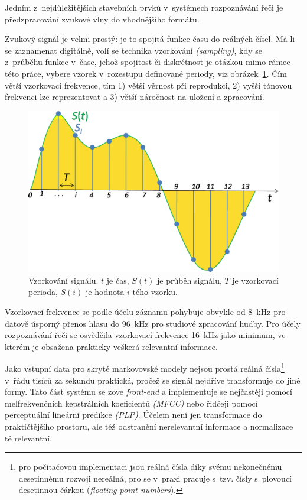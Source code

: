 Jedním z~nejdůležitějších stavebních prvků v~systémech rozpoznávání řeči je
předzpracování zvukové vlny do vhodnějšího formátu.

Zvukový signál je velmi prostý: je to spojitá funkce času do reálných čísel.
Má-li se zaznamenat digitálně, volí se technika vzorkování \textit{(sampling)},
kdy se z~průběhu funkce v~čase, jehož spojitost či diskrétnost je otázkou mimo
rámec této práce, vybere vzorek v~rozestupu definované periody, viz
obrázek~\ref{fig:sampling}. Čím větší
vzorkovací frekvence, tím 1) větší věrnost při reprodukci, 2) vyšší tónovou
frekvenci lze reprezentovat a 3) větší náročnost na uložení a zpracování.

\begin{figure}[htpb]
\includegraphics[scale=0.38]{rc/Signal_Sampling.png}
\caption{
    Vzorkování signálu. $t$ je čas, $S(t)$ je průběh signálu, $T$ je vzorkovací
    perioda, $S(i)$ je hodnota $i$-tého vzorku.
}
\label{fig:sampling}
\end{figure}

Vzorkovací frekvence se podle účelu záznamu pohybuje obvykle od 8~kHz pro
datově úsporný přenos hlasu do 96~kHz pro studiové zpracování hudby. Pro účely
rozpoznávání řeči se osvědčila vzorkovací frekvence 16~kHz jako minimum, ve
kterém je obsažena prakticky veškerá relevantní informace.

Jako vstupní data pro skryté markovovské modely nejsou prostá reálná
čísla\footnote{pro počítačovou implementaci jsou reálná čísla díky svému
nekonečnému desetinnému rozvoji nereálná, pro se v~praxi pracuje s~tzv. čísly
s~plovoucí desetinnou čárkou (\textit{floating-point numbers}).} v~řádu tisíců
za sekundu praktická, pročež se signál nejdříve transformuje do jiné formy. Tato
část systému se zove \textit{front-end} a implementuje se nejčastěji pomocí
melfrekvenčních kepstrálních koeficientů \textit{(MFCC)} nebo řidčeji pomocí
perceptuální lineární predikce \textit{(PLP)}. Účelem není jen transformace do
praktičtějšího prostoru, ale též odstranění nerelevantní informace a normalizace
té relevantní.

